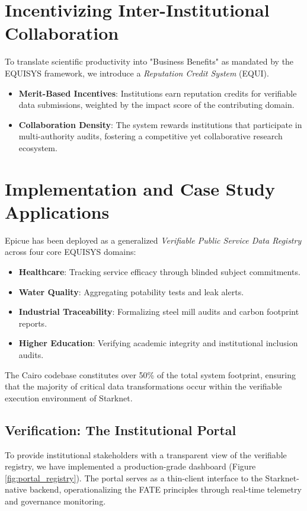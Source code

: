 \documentclass[12pt,a4paper]{article}
\begin{document}
\section{Incentivizing Inter-Institutional Collaboration}
To translate scientific productivity into "Business Benefits" as mandated by the EQUISYS framework, we introduce a \textit{Reputation Credit System} (EQUI).
\begin{itemize}
    \item \textbf{Merit-Based Incentives}: Institutions earn reputation credits for verifiable data submissions, weighted by the impact score of the contributing domain.
    \item \textbf{Collaboration Density}: The system rewards institutions that participate in multi-authority audits, fostering a competitive yet collaborative research ecosystem.
\end{itemize}

\section{Implementation and Case Study Applications}
Epicue has been deployed as a generalized \textit{Verifiable Public Service Data Registry} across four core EQUISYS domains:
\begin{itemize}
    \item \textbf{Healthcare}: Tracking service efficacy through blinded subject commitments.
    \item \textbf{Water Quality}: Aggregating potability tests and leak alerts.
    \item \textbf{Industrial Traceability}: Formalizing steel mill audits and carbon footprint reports.
    \item \textbf{Higher Education}: Verifying academic integrity and institutional inclusion audits.
\end{itemize}

The Cairo codebase constitutes over 50\% of the total system footprint, ensuring that the majority of critical data transformations occur within the verifiable execution environment of Starknet.

\subsection{Verification: The Institutional Portal}
To provide institutional stakeholders with a transparent view of the verifiable registry, we have implemented a production-grade dashboard (Figure \ref{fig:portal_registry}). The portal serves as a thin-client interface to the Starknet-native backend, operationalizing the FATE principles through real-time telemetry and governance monitoring.
\end{document}
